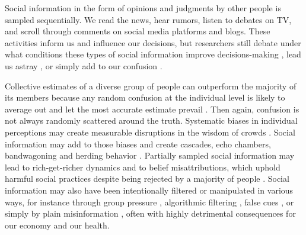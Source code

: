 \documentclass[9pt,a4paper,twocolumn,lineno]{article}
\begin{document}
%

Social information in the form of opinions and judgments by other people is sampled sequentially. We read the news, hear rumors, listen to debates on TV, and scroll through comments on social media platforms and blogs. These activities inform us and influence our decisions, but researchers still debate under what conditions these types of social information improve decisions-making \cite{woolley2010evidence, gurccay2015power, becker2017network, jayles2017social}, lead us astray \cite{caplan2011myth, lorenz2011social, minson2012cost, king2011true, le2018endogenous}, or simply add to our confusion \cite{salganik2006experimental, salganik2009web}.

Collective estimates of a diverse group of people can outperform the majority of its members because any random confusion at the individual level is likely to average out and let the most accurate estimate prevail \cite{galton1907vox, muth1961rational, surowiecki2005wisdom, hong2008some}. Then again, confusion is not always randomly scattered around the truth. Systematic biases in individual perceptions may create measurable disruptions in the wisdom of crowds \cite{izard2008calibrating, nash2014curious, kao2018counteracting}. Social information may add to those biases and create cascades, echo chambers, bandwagoning and herding behavior \cite{anderson1997information, bikhchandani1992theory, bakshy2015exposure, banerjee1992simple}. Partially sampled social information may lead to rich-get-richer dynamics \cite{barabasi1999emergence} and to belief misattributions, which uphold harmful social practices despite being rejected by a majority of people \cite{katz1931students, darley1968bystander, ross1977false, noelle1974spiral, lee2019homophily}. Social information may also have been intentionally filtered or manipulated in various ways, for instance through group pressure \cite{asch1951effects}, algorithmic filtering \cite{pariser2011filter}, false cues \cite{salganik2006experimental, muchnik2013social, hanson1996hits}, or simply by plain misinformation \cite{hendricks2018reality}, often with highly detrimental consequences for our economy and our health.
\end{document}
